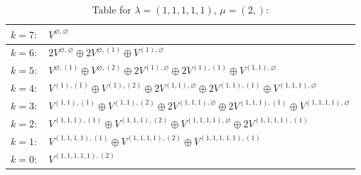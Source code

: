 \documentclass[a4paper,12pt]{article}
\begin{document}
\renewcommand{\arraystretch}{1.6} 
\begin{table}[H]
\centering
\caption{Table for $\lambda = (1, 1, 1, 1, 1)$, $\mu = (2,)$:}
\begin{tabular}{|>{\centering\arraybackslash}p{15cm}|}
\hline
 $k = 7: \quad V^{\varnothing, \varnothing} $ \\ \hline
 $k = 6: \quad 2 V^{\varnothing, \varnothing} \oplus 2 V^{\varnothing, (1)} \oplus V^{(1), \varnothing} $ \\ \hline
 $k = 5: \quad V^{\varnothing, (1)} \oplus V^{\varnothing, (2)} \oplus 2 V^{(1), \varnothing} \oplus 2 V^{(1), (1)} \oplus V^{(1, 1), \varnothing} $ \\ \hline
 $k = 4: \quad V^{(1), (1)} \oplus V^{(1), (2)} \oplus 2 V^{(1, 1), \varnothing} \oplus 2 V^{(1, 1), (1)} \oplus V^{(1, 1, 1), \varnothing} $ \\ \hline
 $k = 3: \quad V^{(1, 1), (1)} \oplus V^{(1, 1), (2)} \oplus 2 V^{(1, 1, 1), \varnothing} \oplus 2 V^{(1, 1, 1), (1)} \oplus V^{(1, 1, 1, 1), \varnothing} $ \\ \hline
 $k = 2: \quad V^{(1, 1, 1), (1)} \oplus V^{(1, 1, 1), (2)} \oplus V^{(1, 1, 1, 1), \varnothing} \oplus 2 V^{(1, 1, 1, 1), (1)} $ \\ \hline
 $k = 1: \quad V^{(1, 1, 1, 1), (1)} \oplus V^{(1, 1, 1, 1), (2)} \oplus V^{(1, 1, 1, 1, 1), (1)} $ \\ \hline
 $k = 0: \quad V^{(1, 1, 1, 1, 1), (2)} $ \\ \hline
\end{tabular}
\end{table}
\end{document}
